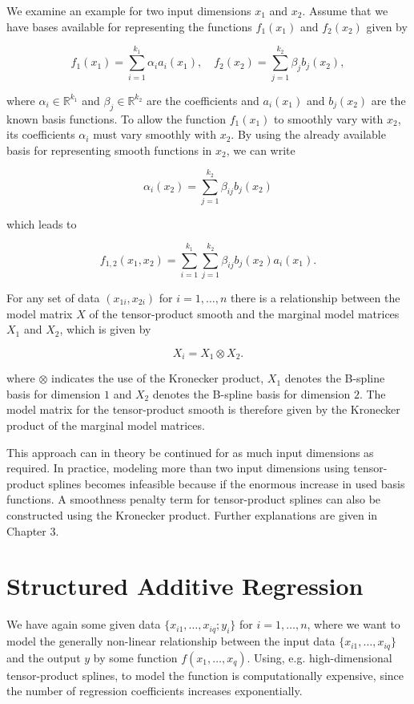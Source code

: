 \documentclass[10pt,a4paper]{article}
\begin{document}
We examine an example for two input dimensions $x_1$ and $x_2$. Assume that we have bases available for representing the functions $f_1(x_1)$ and $f_2(x_2)$ given by

$$f_1(x_1) = \sum_{i=1}^{k_1} \alpha_i a_i(x_1), \quad f_2(x_2) = \sum_{j=1}^{k_2} \beta_j b_j(x_2),$$

where $\alpha_i \in \mathbb{R}^{k_1}$ and $\beta_j \in \mathbb{R}^{k_2}$ are the coefficients and $a_i(x_1)$ and $b_j(x_2)$ are the known basis functions. To allow the function $f_1(x_1)$ to smoothly vary with $x_2$, its coefficients $\alpha_i$ must vary smoothly with $x_2$. By using the already available basis for representing smooth functions in $x_2$, we can write

$$\alpha_i(x_2) = \sum_{j=1}^{k_2} \beta_{ij} b_j(x_2)$$

which leads to

$$f_{1,2}(x_1, x_2) = \sum_{i=1}^{k_1} \sum_{j=1}^{k_2} \beta_{ij} b_j(x_2) a_i(x_1).$$

For any set of data $(x_{1i}, x_{2i})$ for $i = 1, \dots, n$ there is a relationship between the model matrix $X$ of the tensor-product smooth and the marginal model matrices $X_1$ and $X_2$, which is given by 

$$X_i = X_1 \otimes X_2.$$

where $\otimes$ indicates the use of the Kronecker product, $X_1$ denotes the B-spline basis for dimension $1$ and $X_2$ denotes the B-spline basis for dimension $2$. \cite{wood2006GAM} The model matrix for the tensor-product smooth is therefore given by the Kronecker product of the marginal model matrices. 

This approach can in theory be continued for as much input dimensions as required. In practice, modeling more than two input dimensions using tensor-product splines becomes infeasible because if the enormous increase in used basis functions. A smoothness penalty term for tensor-product splines can also be constructed using the Kronecker product. Further explanations are given in Chapter 3.


\section{Structured Additive Regression}

We have again some given data $\{x_{i1}, \dots, x_{iq}; y_i\}$ for $i = 1, \dots, n$, where we want to model the generally non-linear relationship between the input data $\{x_{i1}, \dots, x_{iq}\}$ and the output $y$ by some function $f(x_1, \dots, x_q)$.  Using, e.g. high-dimensional tensor-product splines, to model the function is computationally expensive, since the number of regression coefficients increases exponentially.
\end{document}
